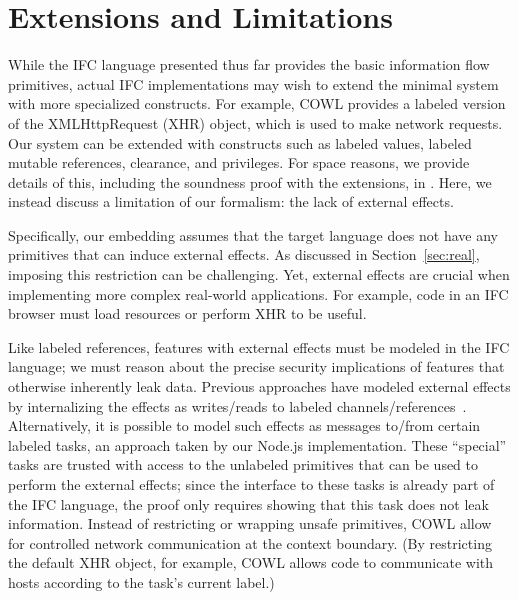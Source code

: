 
\section{Extensions and Limitations}
\label{sec:extensions}
\label{sec:extensions:labeled}

While the IFC language presented thus far provides the basic
information flow primitives, actual IFC implementations
may wish to extend the minimal system with more specialized
constructs.
For example, COWL provides a labeled version of the XMLHttpRequest (XHR) object,
which is used to make network requests.
%
Our system can be extended with constructs such as labeled values,
labeled mutable references, clearance, and privileges.
For space reasons, we provide
details of this, including the soundness
proof with the extensions, in \appendixextfirst{}.
%
Here, we instead discuss a limitation of our formalism: the lack of
external effects.


Specifically, our embedding assumes that the target language does not
have any primitives that can induce external effects.
%
As discussed in Section~\ref{sec:real}, imposing this restriction
can be challenging.
%
Yet, external effects are crucial when implementing more complex
real-world applications.
%
For example, code in an IFC browser must load resources or
perform XHR to be useful.

Like labeled references, features with external effects must be
modeled in the IFC language; we must reason about the precise security
implications of features that otherwise inherently leak data.
%
Previous approaches have modeled external effects by internalizing the
effects as writes/reads to labeled channels/references~\cite{stefan:addressing-covert}.
%
Alternatively, it is possible to model such effects as messages to/from
certain labeled tasks, an approach taken by our Node.js
implementation.
%
These ``special'' tasks are trusted with access to the unlabeled
primitives that can be used to perform the external effects; since the
interface to these tasks is already part of the IFC language, the
proof only requires showing that this task does not leak information.
%
Instead of restricting or wrapping unsafe primitives,
COWL allow for
controlled network communication at the context boundary.
%
(By restricting the default XHR object, for example, COWL allows code
to communicate with hosts according to the task's current label.)
